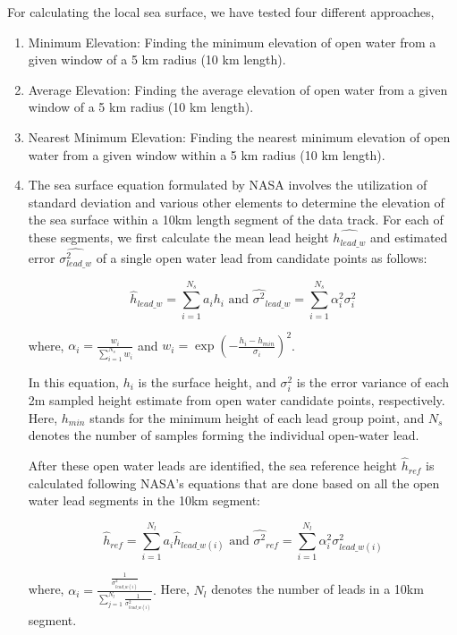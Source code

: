 For calculating the local sea surface, we have tested four different approaches,
\begin{enumerate}
    \item Minimum Elevation: Finding the minimum elevation of open water from a given window of a 5 km radius (10 km length).
    \item Average Elevation: Finding the average elevation of open water from a given window of a 5 km radius (10 km length).
    \item Nearest Minimum Elevation: Finding the nearest minimum elevation of open water from a given window within a 5 km radius (10 km length).
    \item The sea surface equation formulated by NASA involves the utilization of standard deviation and various other elements to determine the elevation of the sea surface within a 10km length segment of the data track. 
    For each of these segments, we first calculate the mean lead height $\hat{h_{lead\_w}}$ and estimated error $\hat{\sigma^2_{lead\_w}}$ of a single open water lead from candidate points as follows:

    \begin{equation}
        \hat{h}_{lead\_w} = \sum_{i=1}^{N_s} a_i h_i
        \text{ and }
        \hat{\sigma^2}_{lead\_w} = \sum_{i=1}^{N_s} \alpha_i^2 \sigma_i^2    
    \end{equation}

    where, $\alpha_i = \frac{w_i}{\sum_{i=1}^{N_s} w_i}$ and $w_i = \exp \left( - \frac{h_i - h_{min}}{\sigma_i} \right)^2 $.

    In this equation, $h_i$ is the surface height, and $\sigma_i^2$ is the error variance of each 2m sampled height estimate from open water candidate points, respectively. 
    Here, $h_{min}$ stands for the minimum height of each lead group point, and $N_s$ denotes the number of samples forming the individual open-water lead.
 
    After these open water leads are identified, the sea reference height $\hat{h}_{ref}$ is calculated following NASA's \cite{kwok2022icesat} equations that are done based on all the open water lead segments in the 10km segment: 
    
    \begin{equation}
        \hat{h}_{ref} = \sum_{i=1}^{N_l} a_i \hat{h}_{lead\_w(i)} 
        \text{ and }
        \hat{\sigma^2}_{ref} = \sum_{i=1}^{N_l} \alpha_i^2 \sigma_{lead\_w(i)}^2
    \end{equation}

    where, $\alpha_i = \frac{\frac{1}{\sigma_{lead\_w(i)}^2}}{\sum_{j=1}^{N_l}\frac{1}{\sigma_{lead\_w(i)}^2}}.$ Here, $N_l$ denotes the number of leads in a 10km segment.

\end{enumerate}

